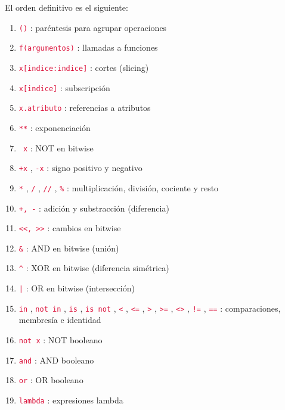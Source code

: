 \documentclass{report}
\newcommand{\ttt}[1]{
  \textcolor{Crimson}{\texttt{#1}}
}
\begin{document}
El orden definitivo es el siguiente:

\begin{enumerate}
  \item \ttt{()}: paréntesis para agrupar operaciones
  
  \item \ttt{f(argumentos)}: llamadas a funciones
  
  \item \ttt{x[indice:indice]}: cortes (slicing)
  
  \item \ttt{x[indice]}: subscripción
  
  \item \ttt{x.atributo}: referencias a atributos
  
  \item \ttt{**}: exponenciación
  
  \item \ttt{~x}: NOT en bitwise
  
  \item \ttt{+x}, \ttt{-x}: signo positivo y negativo
  
  \item \ttt{*}, \ttt{/}, \ttt{//}, \ttt{\%}: multiplicación, división, cociente y resto
  
  \item \ttt{+, -}: adición y substracción (diferencia)
  
  \item \ttt{<<, >>}: cambios en bitwise
  
  \item \ttt{\&}: AND en bitwise (unión)
  
  \item \ttt{\^}: XOR en bitwise (diferencia simétrica)
  
  \item \ttt{|}: OR en bitwise (intersección)
  
  \item \ttt{in}, \ttt{not in}, \ttt{is}, \ttt{is not} , \ttt{<}, \ttt{<=}, \ttt{>}, \ttt{>=}, \ttt{<>}, \ttt{!=}, \ttt{==}: comparaciones, membresía e identidad
  
  \item \ttt{not x}: NOT booleano
  
  \item \ttt{and}: AND booleano
  
  \item \ttt{or}: OR booleano
  
  \item \ttt{lambda}: expresiones lambda

\end{enumerate}
\end{document}
